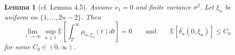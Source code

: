 \documentclass[11pt,a4paper]{article}
\newtheorem{lm}[prop]{Lemma}
\newcommand{\bE}{\mathbb{E}}
\begin{document}



\begin{lm}[cf. \cite{Die13} Lemma 4.5]\label{lm4.5} Assume $\nu_1=0$ and finite variance $\sigma^2$. Let $\xi_n$ be uniform on $\{1,\ldots,2n-2\}$. Then
  $$\lim_{\ell\rightarrow\infty}\sup_{n\ge 1}\bE\left[\int_{2^\ell}^\infty\mu_{n,\xi_n}(t)dt\right]=0\qquad\mbox{and}\qquad\bE[\delta_n^\prime(0,\xi_n)]\le C_0$$
for some $C_0\in(0,\infty)$.
\end{lm}
\end{document}
